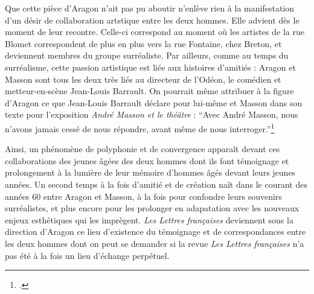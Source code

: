 	 Que cette pièce d'Aragon n'ait pas pu aboutir n'enlève rien à la manifestation d'un désir de collaboration artstique entre les deux hommes. Elle advient dès le moment de leur recontre. Celle-ci correspond au moment où les artistes de la rue Blomet correspondent de plus en plus vers la rue Fontaine, chez Breton, et deviennent membres du groupe surréaliste. Par ailleurs, comme au temps du surréalisme, cette passion artistique est liée aux histoires d’amitiés : Aragon et Masson sont tous les deux très liés au directeur de l’Odéon, le comédien et metteur-en-scène Jean-Louis Barrault. On pourrait même attribuer à la figure d'Aragon ce que Jean-Louis Barrault déclare pour lui-même et Masson dans son texte pour l'exposition \emph{André Masson et le théâtre} : \enquote{Avec André Masson, nous n'avons jamais cessé de nous répondre, avant même de nous interroger.}\footcite[p90]{catalogue}


	 Ainsi, un phénomène de polyphonie et de convergence apparaît devant ces collaborations des jeunes âgées des deux hommes dont ils font témoignage et prolongement à la lumière de leur mémoire d'hommes âgés devant leurs jeunes années. Un second temps à la fois d'amitié et de création naît dans le courant des années 60 entre Aragon et Masson, à la fois pour confondre leurs souvenirs surréalistes, et plus encore pour les prolonger en adapatation avec les nouveaux enjeux esthétiques qui les imprègent. \emph{Les Lettres françaises} deviennent sous la direction d'Aragon ce lieu d'existence du témoignage et de correspondances entre les deux hommes dont on peut se demander si la revue \emph{Les Lettres françaises} n'a pas été à la fois un lieu d'échange perpétuel. 
 